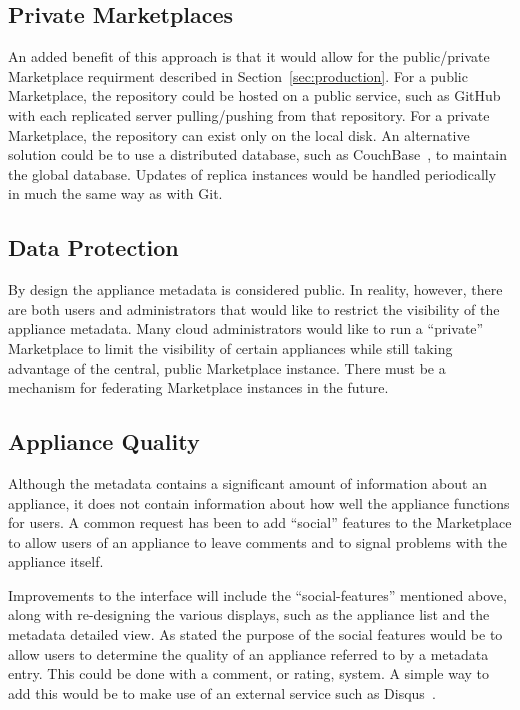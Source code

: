 \subsection{Private Marketplaces}

An added benefit of this approach is that it would allow for the
public/private Marketplace requirment described in
Section~\ref{sec:production}. For a public Marketplace, the repository
could be hosted on a public service, such as GitHub~\cite{github} with
each replicated server pulling/pushing from that repository.  For a
private Marketplace, the repository can exist only on the local
disk. An alternative solution could be to use a distributed database,
such as CouchBase~\cite{couchbase}, to maintain the global
database. Updates of replica instances would be handled periodically
in much the same way as with Git.

\subsection{Data Protection}

By design the appliance metadata is considered public.  In reality,
however, there are both users and administrators that would like to
restrict the visibility of the appliance metadata.  Many cloud
administrators would like to run a ``private'' Marketplace to limit
the visibility of certain appliances while still taking advantage of
the central, public Marketplace instance.  There must be a mechanism
for federating Marketplace instances in the future. 

\subsection{Appliance Quality}

Although the metadata contains a significant amount of information
about an appliance, it does not contain information about how well the
appliance functions for users.  A common request has been to add
``social'' features to the Marketplace to allow users of an appliance
to leave comments and to signal problems with the appliance itself.

Improvements to the interface will include the ``social-features''
mentioned above, along with re-designing the various displays, such as
the appliance list and the metadata detailed view. As stated the
purpose of the social features would be to allow users to determine
the quality of an appliance referred to by a metadata entry. This
could be done with a comment, or rating, system. A simple way to add
this would be to make use of an external service such as
Disqus~\cite{disqus}.


